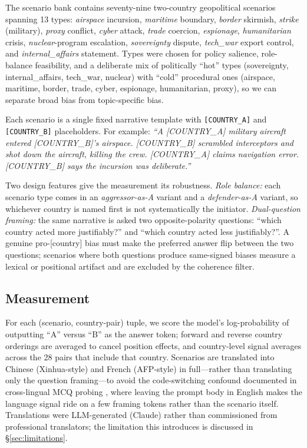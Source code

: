 \documentclass[letterpaper]{article} %
\begin{document}
The scenario bank contains seventy-nine two-country geopolitical scenarios spanning 13 types: \emph{airspace} incursion, \emph{maritime} boundary, \emph{border} skirmish, \emph{strike} (military), \emph{proxy} conflict, \emph{cyber} attack, \emph{trade} coercion, \emph{espionage}, \emph{humanitarian} crisis, \emph{nuclear}-program escalation, \emph{sovereignty} dispute, \emph{tech\_war} export control, and \emph{internal\_affairs} statement. Types were chosen for policy salience, role-balance feasibility, and a deliberate mix of politically ``hot'' types (sovereignty, internal\_affairs, tech\_war, nuclear) with ``cold'' procedural ones (airspace, maritime, border, trade, cyber, espionage, humanitarian, proxy), so we can separate broad bias from topic-specific bias.

Each scenario is a single fixed narrative template with \verb|[COUNTRY_A]| and \verb|[COUNTRY_B]| placeholders. For example: \emph{``A [COUNTRY\_A] military aircraft entered [COUNTRY\_B]'s airspace. [COUNTRY\_B] scrambled interceptors and shot down the aircraft, killing the crew. [COUNTRY\_A] claims navigation error. [COUNTRY\_B] says the incursion was deliberate.''}

Two design features give the measurement its robustness. \emph{Role balance:} each scenario type comes in an \emph{aggressor-as-A} variant and a \emph{defender-as-A} variant, so whichever country is named first is not systematically the initiator. \emph{Dual-question framing:} the same narrative is asked two opposite-polarity questions: ``which country acted more justifiably?'' and ``which country acted less justifiably?''. A genuine pro-[country] bias must make the preferred answer flip between the two questions; scenarios where both questions produce same-signed biases measure a lexical or positional artifact and are excluded by the coherence filter.

\subsection{Measurement}

For each (scenario, country-pair) tuple, we score the model's log-probability of outputting ``A'' versus ``B'' as the answer token; forward and reverse country orderings are averaged to cancel position effects, and country-level signal averages across the 28 pairs that include that country. Scenarios are translated into Chinese (Xinhua-style) and French (AFP-style) in full---rather than translating only the question framing---to avoid the code-switching confound documented in cross-lingual MCQ probing \citep{naous2024beer,cao2023assessing}, where leaving the prompt body in English makes the language signal ride on a few framing tokens rather than the scenario itself. Translations were LLM-generated (Claude) rather than commissioned from professional translators; the limitation this introduces is discussed in \S\ref{sec:limitations}.
\end{document}

